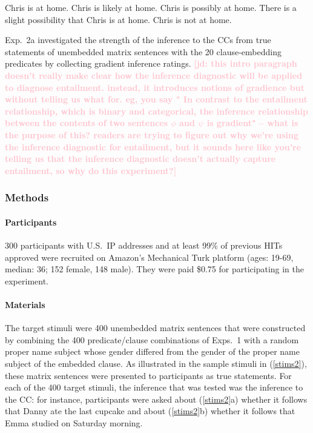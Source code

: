 \documentclass[11pt,fleqn]{article}
\newcommand{\jd}[1]{\textbf{\textcolor{Pink}{[jd: #1]}}}
\newcommand{\6}{\mbox{$[\hspace*{-.6mm}[$}}
\newcommand{\9}{\mbox{$]\hspace*{-.6mm}]$}}
\begin{document}
\begin{exe}
\ex\label{chris}
\begin{xlist}
 Chris is at home.
 Chris is likely at home.
 Chris is possibly at home.
 There is a slight possibility that Chris is at home.
 Chris is not at home.
\end{xlist}
\end{exe}
Exp.~2a investigated the strength of the inference to the CCs from true statements of unembedded matrix sentences with the 20 clause-embedding predicates by collecting gradient inference ratings. \jd{this intro paragraph doesn't really make clear how the inference diagnostic will be applied to diagnose entailment. instead, it introduces notions of gradience but without telling us what for. eg, you say " In contrast to the entailment relationship, which is binary and categorical, the inference relationship between the contents of two sentences $\phi$ and $\psi$ is gradient" -- what is the purpose of this? readers are trying to figure out why we're using the inference diagnostic for entailment, but it sounds here like you're telling us that the inference diagnostic doesn't actually capture entailment, so why do this experiment?}

\subsubsection{Methods}

\paragraph{Participants} 300 participants with U.S.\ IP addresses and at least 99\% of previous HITs approved were recruited on Amazon's Mechanical Turk platform (ages: 19-69, median: 36; 152 female, 148 male). They were paid \$0.75 for participating in the experiment.

\paragraph{Materials} The target stimuli were 400 unembedded matrix sentences that were constructed by combining the 400 predicate/clause combinations of Exps.~1 with a random proper name subject whose gender differed from the gender of the proper name subject of the embedded clause. As illustrated in the sample stimuli in (\ref{stims2}), these matrix sentences were presented to participants as true statements. For each of the 400 target stimuli, the inference that was tested was the inference to the CC: for instance, participants were asked about (\ref{stims2}a) whether it follows that Danny ate the last cupcake and about (\ref{stims2}b) whether it follows that Emma studied on Saturday morning.
\end{document}
